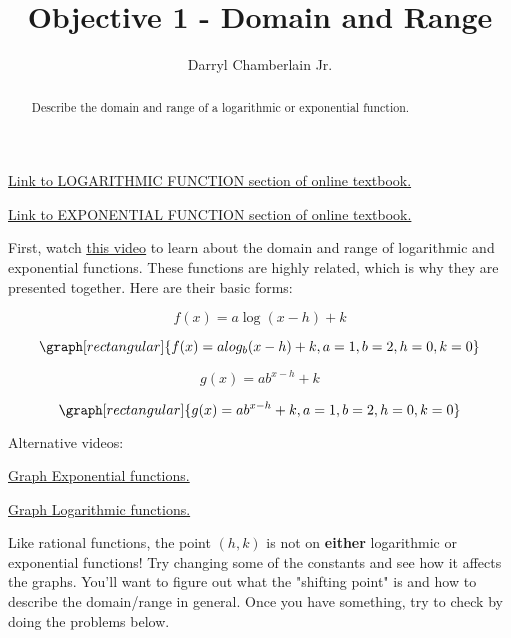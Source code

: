 \documentclass{ximera}
\author{Darryl Chamberlain Jr.}
\title{Objective 1 - Domain and Range}
\begin{document}
\begin{abstract}
Describe the domain and range of a logarithmic or exponential function.
\end{abstract}
\maketitle

\href{https://cnx.org/contents/mwjClAV_@8.1:REGENe1G@20/Graphs-of-Logarithmic-Functions}{Link to LOGARITHMIC FUNCTION section of online textbook.}

\href{https://cnx.org/contents/mwjClAV_@8.1:c8aEyW2u@19/Graphs-of-Exponential-Functions}{Link to EXPONENTIAL FUNCTION section of online textbook.}


First, watch 
\underline{\href{https://mediasite.video.ufl.edu/Mediasite/Play/6054fd6bde6e40d8b4ba241855c1a3651d}{this video}} to learn about the domain and range of logarithmic and exponential functions. These functions are highly related, which is why they are presented together. Here are their basic forms:

$$ f(x) = a\log{(x-h)} + k $$

\[
\graph[rectangular]{f(x)= a log_b{(x-h)} + k, a=1, b=2, h=0, k=0}
\]

$$ g(x) = a b^{x-h} + k $$

\[
\graph[rectangular]{g(x) = a b^{x-h} + k, a=1, b=2, h=0, k=0}
\]

Alternative videos:

\href{http://www.larsonprecalculus.com/precalc10e/content/instructional-videos/chapter-3/section-1/graph-exponential-functions/}{Graph Exponential functions.}

\href{http://www.larsonprecalculus.com/precalc10e/content/instructional-videos/chapter-3/section-2/graphing-logarithmic-functions/}{Graph Logarithmic functions.}

Like rational functions, the point $(h, k)$ is not on \textbf{either} logarithmic or exponential functions! Try changing some of the constants and see how it affects the graphs. You'll want to figure out what the "shifting point" is and how to describe the domain/range in general. Once you have something, try to check by doing the problems below. 

\end{document}
